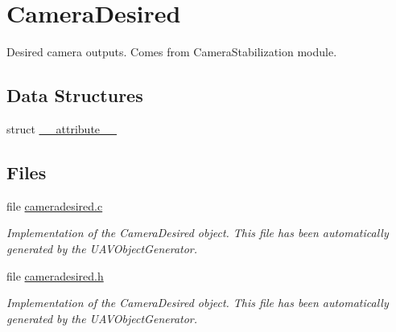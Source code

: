 \hypertarget{group___camera_desired}{\section{\-Camera\-Desired}
\label{group___camera_desired}
}


\-Desired camera outputs. \-Comes from \-Camera\-Stabilization module.  


\subsection*{\-Data \-Structures}
\begin{DoxyCompactItemize}
\item 
struct \hyperlink{struct____attribute____}{\-\_\-\-\_\-attribute\-\_\-\-\_\-}
\end{DoxyCompactItemize}
\subsection*{\-Files}
\begin{DoxyCompactItemize}
\item 
file \hyperlink{cameradesired_8c}{cameradesired.\-c}
\begin{DoxyCompactList}\small\item\em \-Implementation of the \-Camera\-Desired object. \-This file has been automatically generated by the \-U\-A\-V\-Object\-Generator. \end{DoxyCompactList}\item 
file \hyperlink{cameradesired_8h}{cameradesired.\-h}
\begin{DoxyCompactList}\small\item\em \-Implementation of the \-Camera\-Desired object. \-This file has been automatically generated by the \-U\-A\-V\-Object\-Generator. \end{DoxyCompactList}\end{DoxyCompactItemize}

